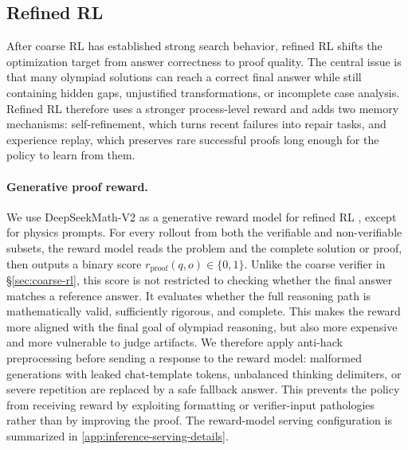\documentclass{llmxive}
\begin{document}
\subsection{Refined RL}

After coarse RL has established strong search behavior, refined RL shifts the
optimization target from answer correctness to proof quality. The central issue
is that many olympiad solutions can reach a correct final answer while still
containing hidden gaps, unjustified transformations, or incomplete case
analysis. Refined RL therefore uses a stronger process-level reward and adds two
memory mechanisms: self-refinement, which turns recent failures into repair
tasks, and experience replay, which preserves rare successful proofs long
enough for the policy to learn from them.

\paragraph{Generative proof reward.}
We use DeepSeekMath-V2 as a generative reward model for refined RL
\citep{deepseekmathv2}, except for physics prompts. 
For every rollout from both the verifiable and
non-verifiable subsets, the reward model reads the problem and the complete
solution or proof, then outputs a binary score $r_{\mathrm{proof}}(q,o)\in
\{0,1\}$. 
Unlike the coarse verifier in \S\ref{sec:coarse-rl}, this score is not restricted to
checking whether the final answer matches a reference answer. 
It evaluates
whether the full reasoning path is mathematically valid, sufficiently rigorous,
and complete. This makes the reward more aligned with the final goal of
olympiad reasoning, but also more expensive and more vulnerable to judge
artifacts. We therefore apply anti-hack preprocessing before sending a response
to the reward model: malformed generations with leaked chat-template tokens,
unbalanced thinking delimiters, or severe repetition are replaced by a safe
fallback answer. This prevents the policy from receiving reward by exploiting
formatting or verifier-input pathologies rather than by improving the proof. The
reward-model serving configuration is summarized in
\cref{app:inference-serving-details}.
\end{document}
